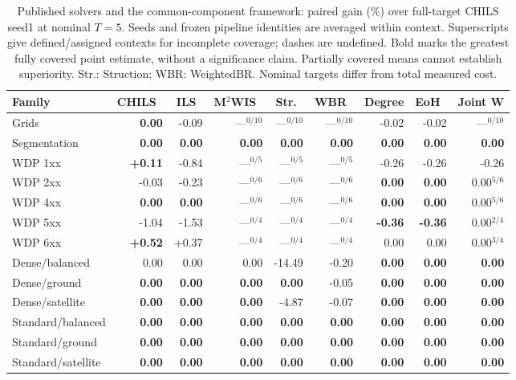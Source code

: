 \begin{table}[t]
\centering
\small
\setlength{\tabcolsep}{3pt}
\caption{Published solvers and the common-component framework: paired gain (\%) over full-target CHILS seed1 at nominal $T=5$. Seeds and frozen pipeline identities are averaged within context. Superscripts give defined/assigned contexts for incomplete coverage; dashes are undefined. Bold marks the greatest fully covered point estimate, without a significance claim. Partially covered means cannot establish superiority. Str.: Struction; WBR: WeightedBR. Nominal targets differ from total measured cost.}
\label{tab:v06-published}
\begin{tabular}{lrrrrrrrr}
\toprule
Family & CHILS~\cite{grossmann2025chils} & ILS~\cite{grossmann2025chils} & M$^2$WIS~\cite{grossmann2024mmwis} & Str.~\cite{gellner2021struction} & WBR~\cite{lamm2019weighted} & Degree & EoH~\cite{liu2024eoh} & Joint W\\
\midrule
Grids & \textbf{0.00} & -0.09 & ---$^{0/10}$ & ---$^{0/10}$ & ---$^{0/10}$ & -0.02 & -0.02 & ---$^{0/10}$\\
Segmentation & \textbf{0.00} & \textbf{0.00} & \textbf{0.00} & \textbf{0.00} & \textbf{0.00} & \textbf{0.00} & \textbf{0.00} & \textbf{0.00}\\
WDP 1xx & \textbf{+0.11} & -0.84 & ---$^{0/5}$ & ---$^{0/5}$ & ---$^{0/5}$ & -0.26 & -0.26 & -0.26\\
WDP 2xx & -0.03 & -0.23 & ---$^{0/6}$ & ---$^{0/6}$ & ---$^{0/6}$ & \textbf{0.00} & \textbf{0.00} & 0.00$^{5/6}$\\
WDP 4xx & \textbf{0.00} & \textbf{0.00} & ---$^{0/6}$ & ---$^{0/6}$ & ---$^{0/6}$ & \textbf{0.00} & \textbf{0.00} & 0.00$^{5/6}$\\
WDP 5xx & -1.04 & -1.53 & ---$^{0/4}$ & ---$^{0/4}$ & ---$^{0/4}$ & \textbf{-0.36} & \textbf{-0.36} & 0.00$^{2/4}$\\
WDP 6xx & \textbf{+0.52} & +0.37 & ---$^{0/4}$ & ---$^{0/4}$ & ---$^{0/4}$ & 0.00 & 0.00 & 0.00$^{3/4}$\\
Dense/balanced & 0.00 & 0.00 & 0.00 & -14.49 & -0.20 & \textbf{0.00} & \textbf{0.00} & \textbf{0.00}\\
Dense/ground & \textbf{0.00} & \textbf{0.00} & \textbf{0.00} & \textbf{0.00} & -0.05 & \textbf{0.00} & \textbf{0.00} & \textbf{0.00}\\
Dense/satellite & \textbf{0.00} & \textbf{0.00} & \textbf{0.00} & -4.87 & -0.07 & \textbf{0.00} & \textbf{0.00} & \textbf{0.00}\\
Standard/balanced & \textbf{0.00} & \textbf{0.00} & \textbf{0.00} & \textbf{0.00} & \textbf{0.00} & \textbf{0.00} & \textbf{0.00} & \textbf{0.00}\\
Standard/ground & \textbf{0.00} & \textbf{0.00} & \textbf{0.00} & \textbf{0.00} & \textbf{0.00} & \textbf{0.00} & \textbf{0.00} & \textbf{0.00}\\
Standard/satellite & \textbf{0.00} & \textbf{0.00} & \textbf{0.00} & \textbf{0.00} & \textbf{0.00} & \textbf{0.00} & \textbf{0.00} & \textbf{0.00}\\
\bottomrule
\end{tabular}
\end{table}

